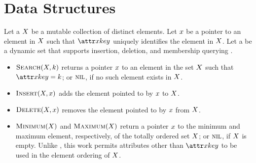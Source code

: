 \chapter{Data Structures}\label{ch:data-structures}

\newcommand{\vKey}{k}
\newcommand{\aSomeElementKey}{\aKey{\vSomeElement}}

Let a  $X$ be a mutable collection of distinct elements. Let $x$ be a pointer to an element in $X$ such that $\aSomeElementKey$ uniquely identifies the element in $X$. Let a  be a dynamic set that supports insertion, deletion, and membership querying \citep{Cormen2022}.
%
\begin{itemize}
    \item $\cSearch[\vSomeSet, \vKey]$ returns a pointer $x$ to an element in the set $X$ such that $\aSomeElementKey \equals \vKey$; or $\textsc{nil}$, if no such element exists in $X$.
    \item $\cInsert[\vSomeSet, \vSomeElement]$ adds the element pointed to by $x$ to $X$.
    \item $\cDelete[\vSomeSet, \vSomeElement]$ removes the element pointed to by $x$ from $X$.
    \item $\cMinimum[\vSomeSet]$ and $\cMaximum[\vSomeSet]$ return a pointer $x$ to the minimum and maximum element, respectively, of the totally ordered set $X$; or $\textsc{nil}$, if $X$ is empty. Unlike \citet{Cormen2022}, this work permits attributes other than $\aSomeElementKey$ to be used in the element ordering of $X$.
\end{itemize}